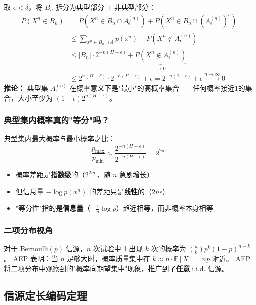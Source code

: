 \documentclass[12pt,a4paper]{ctexart}
\theoremstyle{definition}
\newcommand{\EE}{\mathbb{E}}
\begin{document}
\begin{proofbox}
取 $\epsilon < \delta$，将 $B_n$ 拆分为典型部分 + 非典型部分：
\begin{align*}
P(X^n \in B_n) &= P(X^n \in B_n \cap A_\epsilon^{(n)}) + P(X^n \in B_n \cap (A_\epsilon^{(n)})^c) \\
&\leq \sum_{x^n \in B_n \cap A} p(x^n) + P(X^n \notin A_\epsilon^{(n)}) \\
&\leq |B_n| \cdot 2^{-n(H-\epsilon)} + \underbrace{P(X^n \notin A_\epsilon^{(n)})}_{\to 0} \\
&\leq 2^{n(H-\delta)} \cdot 2^{-n(H-\epsilon)} + \epsilon = 2^{-n(\delta-\epsilon)} + \epsilon \xrightarrow{n\to\infty} 0
\end{align*}
\textbf{推论：} 典型集 $A_\epsilon^{(n)}$ 在概率意义下是"最小"的高概率集合——任何概率接近1的集合，大小至少为 $(1-\epsilon)2^{n(H-\epsilon)}$。
\end{proofbox}

\subsubsection{典型集内概率真的"等分"吗？}

\begin{keybox}[渐近等分不等于概率均等]
典型集内最大概率与最小概率之比：
\[
\frac{p_{\max}}{p_{\min}} \approx \frac{2^{-n(H-\epsilon)}}{2^{-n(H+\epsilon)}} = 2^{2n\epsilon}
\]
\begin{itemize}[nosep]
  \item 概率差距是\textbf{指数级}的（$2^{2n\epsilon}$，随 $n$ 急剧增长）
  \item 但信息量 $-\log p(x^n)$ 的差距只是\textbf{线性}的（$2n\epsilon$）
  \item "等分性"指的是\textbf{信息量}（$-\frac{1}{n}\log p$）趋近相等，而非概率本身相等
\end{itemize}
\end{keybox}

\subsubsection{二项分布视角}

对于 Bernoulli$(p)$ 信源，$n$ 次试验中 1 出现 $k$ 次的概率为 $\binom{n}{k}p^k(1-p)^{n-k}$。
AEP 表明：当 $n$ 足够大时，概率质量集中在 $k \approx n \cdot \EE[X] = np$ 附近。
AEP 将二项分布中观察到的"概率向期望集中"现象，推广到了\textbf{任意} i.i.d. 信源。

\subsection{信源定长编码定理}
\end{document}
